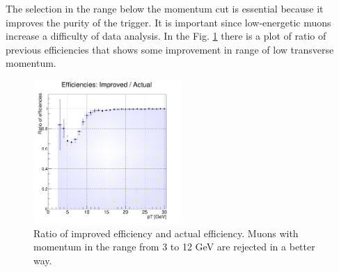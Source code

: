 The selection in the range below the momentum cut is essential because it improves the purity of the trigger.
It is important since low-energetic muons increase a difficulty of data analysis.
In the Fig. \ref{ratio} there is a plot of ratio of previous efficiencies that shows some improvement in range of low transverse momentum.

\begin{figure}[ht]
\centering
\includegraphics[width=0.5\textwidth]{Ratio16.png}
\caption{Ratio of improved efficiency and actual efficiency. Muons with momentum in the range from 3 to 12 GeV are rejected in a better way.}
\label{ratio}
\end{figure} 

